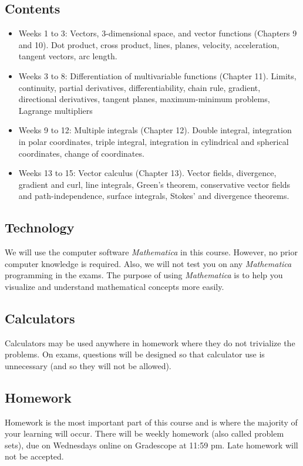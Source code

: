 \documentclass[11pt,oneside]{amsart}
\begin{document}
\subsection*{Contents}
\begin{itemize}
    \item Weeks 1 to 3: Vectors, 3-dimensional space, and vector functions (Chapters 9 and 10). Dot product, cross product, lines, planes, velocity, acceleration, tangent vectors, arc length.

    \item Weeks 3 to 8: Differentiation of multivariable functions (Chapter 11). Limits, continuity, partial derivatives, differentiability, chain rule, gradient, directional derivatives, tangent planes, maximum-minimum problems, Lagrange multipliers

    \item Weeks 9 to 12: Multiple integrals (Chapter 12). Double integral, integration in polar coordinates, triple integral, integration in cylindrical and spherical coordinates, change of coordinates.

    \item Weeks 13 to 15: Vector calculus (Chapter 13). Vector fields, divergence, gradient and curl, line integrals, Green's theorem, conservative vector fields and path-independence, surface integrals, Stokes' and divergence theorems.
\end{itemize}

\subsection*{Technology} We will use the computer software \emph{Mathematica} in this course. However, no prior computer knowledge is required. Also, we will not test you on any \emph{Mathematica} programming in the exams. The purpose of using \emph{Mathematica} is to help you visualize and understand mathematical concepts more easily.

\subsection*{Calculators} Calculators may be used anywhere in homework where they do not trivialize the problems. On exams, questions will be designed so that calculator use is unnecessary (and so they will not be allowed).

\subsection*{Homework}
Homework is the most important part of this course and is where the majority of your learning will occur. There will be weekly homework (also called problem sets), due on Wednesdays online on Gradescope at 11:59 pm. Late homework will not be accepted.
\end{document}
